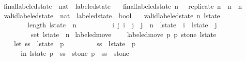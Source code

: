 \begin{isabellebody}
\isanewline
{}\isamarkupfalse%
\ final{\isacharunderscore}labeled{\isacharunderscore}state\ {\isacharcolon}{\isacharcolon}\ {\isachardoublequoteopen}nat\ {\isasymRightarrow}\ labeled{\isacharunderscore}state{\isachardoublequoteclose}\ \isanewline
\ \ {\isachardoublequoteopen}final{\isacharunderscore}labeled{\isacharunderscore}state\ n\ \ {\isacharequal}\ {\isacharparenleft}replicate\ {\isacharparenleft}n{\isacharplus}{}{\isacharparenright}\ {\isacharbraceleft}{\isacharbraceright}{\isacharparenright}\ {\isacharbrackleft}n\ {\isacharcolon}{\isacharequal}\ {\isacharbraceleft}{}{\isachardot}{\isachardot}{\isacharless}n{\isacharbraceright}{\isacharbrackright}{\isachardoublequoteclose}\isanewline
\isanewline
{}\isamarkupfalse%
\ valid{\isacharunderscore}labeled{\isacharunderscore}state\ {\isacharcolon}{\isacharcolon}\ {\isachardoublequoteopen}nat\ {\isasymRightarrow}\ labeled{\isacharunderscore}state\ {\isasymRightarrow}\ bool{\isachardoublequoteclose}\ \isanewline
\ \ {\isachardoublequoteopen}valid{\isacharunderscore}labeled{\isacharunderscore}state\ n\ l{\isacharunderscore}state\ {\isasymlongleftrightarrow}\ \isanewline
\ \ \ \ \ \ \ \ length\ l{\isacharunderscore}state\ {\isacharequal}\ n{\isacharplus}{}\ {\isasymand}\isanewline
\ \ \ \ \ \ \ \ {\isacharparenleft}{\isasymforall}\ i\ j{\isachardot}\ i\ {\isacharless}\ j\ {\isasymand}\ j\ {\isasymle}\ n\ {\isasymlongrightarrow}\ l{\isacharunderscore}state\ {\isacharbang}\ i\ {\isasyminter}\ l{\isacharunderscore}state\ {\isacharbang}\ j\ {\isacharequal}\ {\isacharbraceleft}{\isacharbraceright}{\isacharparenright}\ {\isasymand}\isanewline
\ \ \ \ \ \ \ \ {\isacharparenleft}{\isasymUnion}\ {\isacharparenleft}set\ l{\isacharunderscore}state{\isacharparenright}{\isacharparenright}\ {\isacharequal}\ {\isacharbraceleft}{}{\isachardot}{\isachardot}{\isacharless}n{\isacharbraceright}{\isachardoublequoteclose}\isanewline
\isanewline
{}\isamarkupfalse%
\ labeled{\isacharunderscore}move\ \ \isanewline
\ \ {\isachardoublequoteopen}labeled{\isacharunderscore}move\ p{}\ p{}\ stone\ l{\isacharunderscore}state\ {\isacharequal}\ \isanewline
\ \ \ \ {\isacharparenleft}let\ ss{}\ {\isacharequal}\ l{\isacharunderscore}state\ {\isacharbang}\ p{}{\isacharsemicolon}\isanewline
\ \ \ \ \ \ \ \ \ ss{}\ {\isacharequal}\ l{\isacharunderscore}state\ {\isacharbang}\ p{}\ \isanewline
\ \ \ \ \ \ in\ l{\isacharunderscore}state\ {\isacharbrackleft}p{}\ {\isacharcolon}{\isacharequal}\ ss{}\ {\isacharminus}\ {\isacharbraceleft}stone{\isacharbraceright}{\isacharcomma}\ p{}\ {\isacharcolon}{\isacharequal}\ ss{}\ {\isasymunion}\ {\isacharbraceleft}stone{\isacharbraceright}{\isacharbrackright}{\isacharparenright}{\isachardoublequoteclose}\isanewline

\end{isabellebody}
